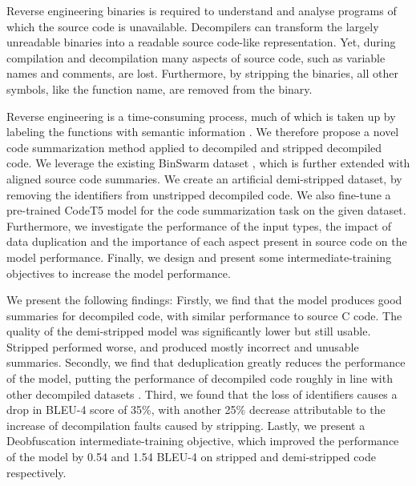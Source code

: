 Reverse engineering binaries is required to understand and analyse programs of which the source code is unavailable. Decompilers can transform the largely unreadable binaries into a readable source code-like representation. Yet, during compilation and decompilation many aspects of source code, such as variable names and comments, are lost. Furthermore, by stripping the binaries, all other symbols, like the function name, are removed from the binary.

Reverse engineering is a time-consuming process, much of which is taken up by labeling the functions with semantic information \cite{reverseEngineerProcess}. We therefore propose a novel code summarization method applied to decompiled and stripped decompiled code. We leverage the existing BinSwarm dataset \cite{InlinedFunc}, which is further extended with aligned source code summaries. We create an artificial demi-stripped dataset, by removing the identifiers from unstripped decompiled code. We also fine-tune a pre-trained CodeT5 model for the code summarization task on the given dataset. Furthermore, we investigate the performance of the input types, the impact of data duplication and the importance of each aspect present in source code on the model performance. Finally, we design and present some intermediate-training objectives to increase the model performance.

We present the following findings: Firstly, we find that the model produces good summaries for decompiled code, with similar performance to source C code. The quality of the demi-stripped model was significantly lower but still usable. Stripped performed worse, and produced mostly incorrect and unusable summaries. Secondly, we find that deduplication greatly reduces the performance of the model, putting the performance of decompiled code roughly in line with other decompiled datasets \cite{CodeT5}. Third, we found that the loss of identifiers causes a drop in BLEU-4 score of 35\%, with another 25\% decrease attributable to the increase of decompilation faults caused by stripping. Lastly, we present a Deobfuscation intermediate-training objective, which improved the performance of the model by 0.54 and 1.54  BLEU-4 on stripped and demi-stripped code respectively. 